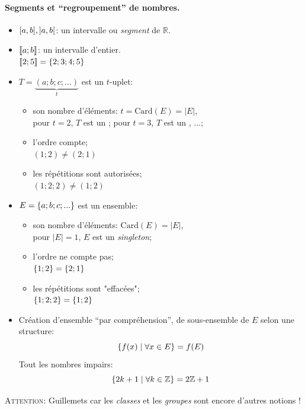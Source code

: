 \documentclass[12pt]{article}
\begin{document}
\paragraph{Segments et \enquote{regroupement} de nombres.} 
\begin{itemize}
    \item $\interval{a}{b}, \interval[open]{a}{b}$: 
        un intervalle ou \textit{segment} de $\mathbb{R}$.
    \item[\Il] $\left\llbracket a; b \right\rrbracket$: un intervalle d'entier. \\
        \Ex $\left\llbracket 2; 5 \right\rrbracket = \left\{2; 3; 4; 5\right\}$

    \item $T = \underbrace{\left(a; b; c; ...\right)}_{t}$ 
        est un $t$-uplet:
        \begin{itemize}
            \item son nombre d'éléments: $t = \text{Card}({E}) = |E|$, \\
                pour $t = 2$, $T$ est un ;
                pour $t = 3$, $T$ est un , $\dots$;
            \item l'ordre compte; \\
            \Ex $\left(1; 2\right) \neq \left(2; 1\right)$
            \item les répétitions sont autorisées; \\
            \Ex $\left(1; 2; 2\right) \neq \left(1; 2\right)$
        \end{itemize} 

    \item $E = \left\{a; b; c; ...\right\}$ est un ensemble:
        \begin{itemize}
            \item son nombre d'éléments: $\text{Card}({E}) = |E|$, \\
                pour $|E| = 1$, $E$ est un \textit{singleton};
            \item l'ordre ne compte pas; \\
            \Ex $\left\{1; 2\right\} = \left\{2; 1\right\}$
            \item les répétitions sont "effacées"; \\
            \Ex $\left\{1; 2; 2\right\} = \left\{1; 2\right\}$
        \end{itemize} 

    \item Création d'ensemble \enquote{par compréhension},
        de sous-ensemble de $E$ selon une structure: $$
        \left\{f(x) \;\vert\;  \forall x \in E\right\} = f(E) 
        $$ 
        \Ex Tout les nombres impairs: $$
            \left\{2k + 1 \;\vert\; \forall k \in \mathbb{Z}\right\} 
          = 2\mathbb{Z} + 1
        $$
\end{itemize}
\textsc{Attention}: Guillemets car les \textit{classes} et les 
    \textit{groupes} sont encore d'autres notions !
\end{document}

